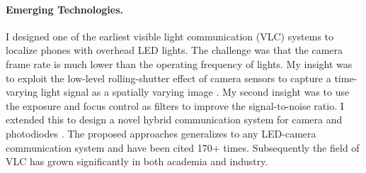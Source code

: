 \documentclass[10pt]{article}
\begin{document}

\paragraph{Emerging Technologies. }
I designed one of the earliest visible light communication (VLC) systems to localize phones with overhead LED lights. The challenge was that the camera frame rate is much lower than the operating frequency of lights. 
My insight was to exploit the low-level rolling-shutter effect of camera sensors to capture a time-varying light signal as a spatially varying image \cite{rajagopal2014visual, rajagopal2014demonstration}. My second insight was to use the exposure and focus control as filters to improve the signal-to-noise ratio. I extended this to design a novel hybrid communication system for camera and photodiodes \cite{rajagopal2014hybrid}. 
The proposed approaches generalizes to any LED-camera communication system and have been cited 170+ times. Subsequently the field of VLC has grown significantly in both academia and industry.
\end{document}
